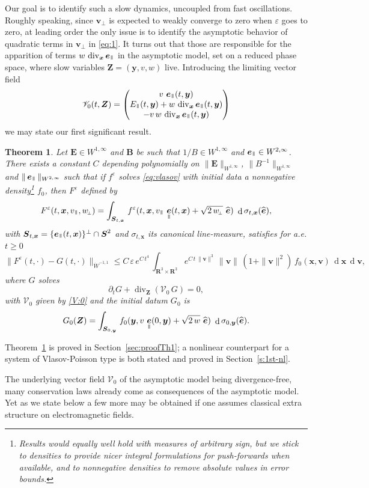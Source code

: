 \documentclass[JEP,XML,SOM,Unicode]{cedram}
\let\mathcal\mathscr
\newcommand{\sperp}{{\scriptscriptstyle\perp}}
\let\eps\varepsilon
\let\d\partial
\DeclareMathOperator\dD{d}\let\dd\dD
\DeclareMathOperator{\Div}{div}
\theoremstyle{plain}
\newtheorem{theorem}{Theorem}[section]
\theoremstyle{definition}
\newcommand\bp{\begin{pmatrix}}
\newcommand\ep{\end{pmatrix}}
\newcommand{\be}{\begin{equation}}
\newcommand{\ee}{\end{equation}}
\newcommand{\bt}{\begin{theorem}}
\newcommand{\et}{\end{theorem}}
\newcommand\R{\mathbf R}
\newcommand\bB{{\boldsymbol B}}
\newcommand\bE{{\boldsymbol E}}
\newcommand\bS{{\boldsymbol S}}
\newcommand\bfv{{\boldsymbol v}}
\newcommand\bfx{{\boldsymbol x}}
\newcommand\bfy{{\boldsymbol y}}
\newcommand\bfZ{{\boldsymbol Z}}
\newcommand\cV{{\mathcal V}}
\DeclareMathOperator{\beD}{\boldsymbol{e}}
\newcommand\eDpar{\beD_\mypar}
\newcommand\bvperp{\bfv_{\!\sperp}}
\newcommand\eperp{w_{\!\sperp}}
\let\e w
\newcommand\Epar{E_\mypar}
\newcommand{\mypar}{{\mkern3mu\vphantom{\perp}\vrule depth 0pt\mkern2mu\vrule depth 0pt\mkern3mu}}
\begin{document}
Our goal is to identify such a slow dynamics, uncoupled from fast oscillations. Roughly speaking, since $\bvperp$ is expected to weakly converge to zero when $\eps$ goes to zero, at leading order the only issue is to identify the asymptotic behavior of quadratic terms in $\bvperp$ in \eqref{eq:1}. It turns out that those are responsible for the apparition of terms $\e\,\Div_\bfx\eDpar$ in the asymptotic model, set on a reduced phase space, where slow variables $\bfZ=(\bfy,v,\e)$ live. Introducing the limiting vector field
\be
\label{V:0}
\cV_0(t,\bfZ)
=\bp
v\,\eDpar(t,\bfy)\\
\Epar(t,\bfy)+\e\,\Div_\bfx\eDpar(t,\bfy)\\
-v\,\e\,\Div_\bfx\eDpar(t,\bfy)
\ep
\ee
we may state our first significant result.

\bt\label{th:1}
Let $\bE\in W^{1,\infty}$ and $\bB$ be such that $1/B\in W^{1,\infty}$ and $\eDpar\in W^{2,\infty}$. There exists a constant $C$ depending polynomially on $\|\bE\|_{W^{1,\infty}}$, $\|B^{-1}\|_{W^{1,\infty}}$ and $\|\eDpar\|_{W^{2,\infty}}$ such that if $f^\eps$ solves \eqref{eq:vlasov} with initial data a nonnegative density\footnote{Results would equally well hold with measures of arbitrary sign, but we stick to densities to provide nicer integral formulations for push-forwards when available, and to nonnegative densities to remove absolute values in error bounds.} $f_0$, then $F^\eps$ defined by
\[
F^\eps(t,\bfx,v_\mypar,\eperp)=\int_{\bS_{t,\bfx}}\,f^\eps(t,\bfx,v_\mypar\,\eDpar(t,\bfx)+\sqrt{2\,\eperp}\ \widehat{\beD})\ \dD \sigma_{t,\bfx}(\widehat{\beD}),
\]
with $\bS_{t,\bfx}=\{\eDpar(t,\bfx)\}^\perp\cap\bS^2$ and $\sigma_{t,\bfx}$ its canonical line-measure, satisfies for a.e. $t\geq0$
\[
\|F^\eps(t,\cdot)-G(t,\cdot)\|_{\dot{W}^{-1,1}}
\leq C\,\eps\,e^{C\,t^4}\,\int_{\R^3\times\R^3} e^{C\,t\,\|\bfv\|^3}\,\|\bfv\|\,(1+\|\bfv\|^2)\,f_0(\bfx,\bfv)\,\dD\bfx\,\dD\bfv,
\]
where $G$ solves
\be
\label{eq:1st}
\d_t G+\Div_\bfZ \left(\cV_0\,G \right) =0,
\ee
with $\cV_0$ given by \eqref{V:0} and the initial datum $G_0$ is
\[
G_0(\bfZ)=\int_{\bS_{0,\bfy}}\,f_0(\bfy,v\,\eDpar(0,\bfy)+\sqrt{2\,\e}\ \widehat{\beD})\ \dD \sigma_{0,\bfy}(\widehat{\beD}).
\]
\et
Theorem~\ref{th:1} is proved in Section~\ref{sec:proofTh1}; a nonlinear counterpart for a system of Vlasov-Poisson type is both stated and proved in Section~\ref{s:1st-nl}.

The underlying vector field $\cV_0$ of the asymptotic model being divergence-free, many conservation laws already come as consequences of the asymptotic model. Yet as we state below a few more may be obtained if one assumes classical extra structure on electromagnetic fields.
\end{document}
